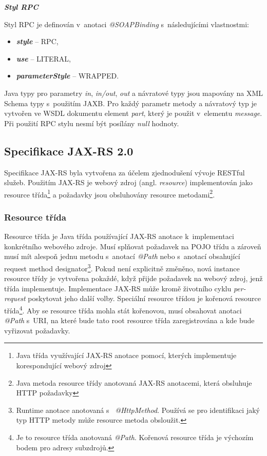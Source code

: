 \documentclass[11pt,twoside,a4paper]{book}
\begin{document}
\textbf{\textit{Styl RPC}}

Styl RPC je definován v~anotaci {\em @SOAPBinding} s~následujícími vlastnostmi:

\begin{itemize}
  \item \textbf{\textit{style}} – RPC,
  \item \textbf{\textit{use}} – LITERAL,
  \item \textbf{\textit{parameterStyle}} – WRAPPED.
\end{itemize}

Java typy pro parametry {\em in}, {\em in/out}, {\em out} a návratové
typy jsou mapovány na XML Schema typy s~použitím JAXB. Pro každý parametr metody a návratový typ je vytvořen ve WSDL
dokumentu element {\em part}, který je použit v~elementu {\em message}. Při
použití RPC stylu nesmí být posílány {\em null} hodnoty.

\subsection{Specifikace JAX-RS 2.0}
\label{subsec:specifikace-jax-rs}

Specifikace JAX-RS \cite{JAXRS20} byla vytvořena za účelem zjednodušení vývoje
RESTful služeb.
Použitím JAX-RS je webový zdroj (angl. {\em resource})  implementován jako
resource třída\footnote{Java třída využívající JAX-RS anotace pomocí,
kterých implementuje korespondující webový zdroj} a požadavky jsou obsluhovány resource
metodami\footnote{Java metoda resource třídy anotovaná JAX-RS
anotacemi, která obsluhuje HTTP požadavky}.

\subsubsection{Resource třída}
\label{subsec:resource-trida}

Resource třída je Java třída používající JAX-RS anotace k~implementaci
konkrétního webového zdroje. Musí splňovat požadavek na POJO třídu a zároveň
musí mít alespoň jednu metodu s~anotací {\em @Path} nebo s~anotací obsahující
request method designator\footnote{Runtime anotace anotovaná s~{\em
@HttpMethod}.
Používá se pro identifikaci jaký typ HTTP metody může resource metoda
obsloužit.}.
Pokud není explicitně změněno, nová instance resource třídy je vytvořena
pokaždé, když přijde požadavek na webový zdroj, jenž třída implementuje.
Implementace JAX-RS může kromě životního cyklu {\em per-request} poskytovat
jeho další volby. Speciální resource třídou je kořenová resource
třída\footnote{Je to resource třída anotovaná {\em @Path}. Kořenová resource
třída je výchozím bodem pro adresy subzdrojů.}.
Aby se resource třída mohla stát kořenovou, musí obsahovat anotaci {\em @Path}
s~URI, na které bude tato root resource třída zaregistrována a kde bude vyřizovat požadavky. \cite{JAXRS20}
\end{document}
